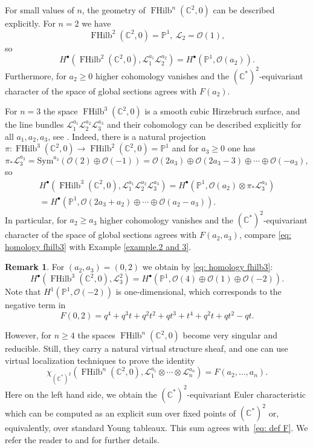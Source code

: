 \documentclass[11pt,reqno]{amsart}
\theoremstyle{definition}
\newtheorem{remark}[theorem]{Remark}
\numberwithin{equation}{section}
\DeclareMathOperator{\FHilb}{FHilb}
\newcommand{\CC}{\mathbb{C}}
\newcommand{\CL}{\mathcal{L}}
\newcommand{\CO}{\mathcal{O}}
\begin{document}
For small values of $n$, the geometry of $\FHilb^n(\CC^2,0)$ can be described explicitly. For $n=2$ we have 
\[
	\FHilb^2(\CC^2,0)=\mathbb{P}^1,\ \CL_2=\CO(1),
\]
so 
\[
	H^{\bullet}(\FHilb^2(\CC^2,0),\CL_1^{a_1} \CL_2^{a_2})=H^{\bullet}(\mathbb{P}^1,\CO(a_2)).
\]
Furthermore, for $a_2\geqslant 0$ higher cohomology vanishes and the $(\CC^*)^2$-equivariant character of the space of 
global sections agrees with $F(a_2)$. 

For $n=3$ the space $\FHilb^3(\CC^2,0)$ is a smooth cubic Hirzebruch surface, 
and the line bundles $\CL_1^{a_1}\CL_2^{a_2}\CL_3^{a_3}$ and their cohomology can be described explicitly for 
all $a_1,a_2,a_3$, see \cite{GNR.2016}. 
Indeed, there is a natural projection $\pi \colon \FHilb^3(\CC^2,0)\to \FHilb^2(\CC^2,0)=\mathbb{P}^1$
and  for $a_3\geqslant 0$ one has 
\[
	\pi_*\CL_3^{a_3}=\mathrm{Sym}^{a_3}(\CO(2)\oplus\CO(-1))
	=\CO(2a_3)\oplus \CO(2a_3-3)\oplus\cdots\oplus \CO(-a_3),
\]
so
\begin{multline}
\label{eq: homology fhilb3}
	H^{\bullet}(\FHilb^3(\CC^2,0),\CL_1^{a_1}\CL_2^{a_2}\CL_3^{a_3})
	=H^{\bullet}(\mathbb{P}^1,\CO(a_2)\otimes \pi_*\CL_3^{a_3})\\
	=H^{\bullet}(\mathbb{P}^1,\CO(2a_3+a_2)\oplus\cdots \oplus \CO(a_2-a_3)).
\end{multline}
In particular, for $a_2\geqslant a_3$ higher cohomology vanishes and the $(\CC^*)^2$-equivariant character of the space 
of global sections agrees with $F(a_2,a_3)$, compare \eqref{eq: homology fhilb3} with Example \ref{example.2 and 3}. 

\begin{remark}
For $(a_2,a_3)=(0,2)$ we obtain by \eqref{eq: homology fhilb3}:
\[
	H^{\bullet}(\FHilb^3(\CC^2,0),\CL_3^{2})=H^{\bullet}(\mathbb{P}^1,\CO(4)\oplus\CO(1)\oplus\CO(-2)).
\]
Note that $H^1(\mathbb{P}^1,\CO(-2))$ is one-dimensional, which corresponds to the negative term in
\[
	F(0,2)=q^4 + q^3t + q^2t^2 + qt^3 + t^4 + q^2t + qt^2 - qt.
\]
\end{remark}

However, for $n\geqslant 4$ the spaces $\FHilb^n(\CC^2,0)$ become very singular and reducible. Still, they
carry a natural virtual structure sheaf, and one can use virtual localization techniques to prove the identity
\[
	\chi_{(\CC^*)^2}(\FHilb^n(\CC^2,0),\CL_1^{a_1}\otimes\cdots\otimes \CL_n^{a_n})=F(a_2,\ldots,a_n).
\]
Here on the left hand side, we obtain the $(\CC^*)^2$-equivariant Euler characteristic which can be computed as 
an explicit sum over fixed points of $(\CC^*)^2$ or, equivalently, over standard Young tableaux. This sum agrees 
with~\eqref{eq: def F}. We refer the reader to \cite{GN.2015} and \cite{GNR.2016} for further details.
\end{document}
